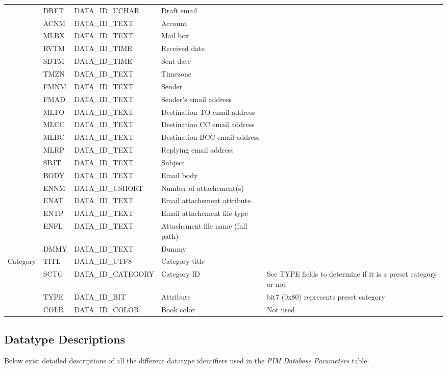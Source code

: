 \begin{longtable}[c]{|l|l|l|p{3cm}|p{5cm}|}
        & DRFT & DATA\_ID\_UCHAR & Draft email & \\
        & ACNM & DATA\_ID\_TEXT & Account & \\
        & MLBX & DATA\_ID\_TEXT & Mail box & \\
        & RVTM & DATA\_ID\_TIME & Received date & \\
        & SDTM & DATA\_ID\_TIME & Sent date & \\
        & TMZN & DATA\_ID\_TEXT & Timezone & \\
        & FMNM & DATA\_ID\_TEXT & Sender & \\
        & FMAD & DATA\_ID\_TEXT & Sender's email address & \\
        & MLTO & DATA\_ID\_TEXT & Destination TO email address & \\
        & MLCC & DATA\_ID\_TEXT & Destination CC email address & \\
        & MLBC & DATA\_ID\_TEXT & Destination BCC email address & \\
        & MLRP & DATA\_ID\_TEXT & Replying email address & \\
        & SBJT & DATA\_ID\_TEXT & Subject & \\
        & BODY & DATA\_ID\_TEXT & Email body & \\
        & ENNM & DATA\_ID\_USHORT & Number of attachement(s) & \\
        & ENAT & DATA\_ID\_TEXT & Email attachement attribute & \\
        & ENTP & DATA\_ID\_TEXT & Email attachement file type & \\
        & ENFL & DATA\_ID\_TEXT & Attachement file name (full path) & \\
        & DMMY & DATA\_ID\_TEXT & Dummy & \\
        \hline
        Category & TITL & DATA\_ID\_UTF8 & Category title & \\
        & SCTG & DATA\_ID\_CATEGORY & Category ID & See TYPE fields to
        determine if it is a preset category or not \\
        & TYPE & DATA\_ID\_BIT & Attribute & bit7 (0x80) represents preset
        category \\
        & COLR & DATA\_ID\_COLOR & Book color & Not used \\
        \hline
    \end{longtable}

\normalsize
    \subsection{Datatype Descriptions}
    \label{type:desc}
    Below exist detailed descriptions of all the different datatype
    identifiers used in the \emph{PIM Database Parameters} table.

